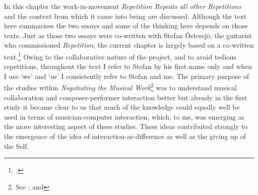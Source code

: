 \hspace{6.5cm}




\noindent In this chapter the work-in-movement \emph{Repetition Repeats all other Repetitions} and the context from which it came into being are discussed. Although the text here summarises the two essays  and  some of the thinking here depends on those texts. Just as those two essays were co-written with Stefan \"{O}stersj\"{o}, the guitarist who commissioned \emph{Repetition}, the current chapter is largely based on a co-written text.\footcite[Another version of the original text is part of his PhD thesis. See][]{ostersjo08} Owing to the collaborative nature of the project, and to avoid tedious repetitions, throughout the text I refer to Stefan by his first name only and when I use `we' and `us' I consistently refer to Stefan and me. The primary purpose of the studies within \emph{Negotiating the Musical Work}\footnote{See ; and } was to understand musical collaboration and composer-performer interaction better but already in the first study it became clear to us that much of the knowledge could equally well be used in terms of musician-computer interaction, which, to me, was emerging as the more interesting aspect of these studies. These ideas contributed strongly to the emergence of the idea of interaction-as-difference as well as the giving up of the Self.



